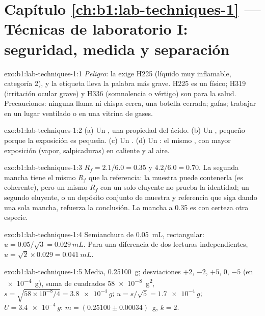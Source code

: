 \section*{Capítulo \ref{ch:b1:lab-techniques-1} --- Técnicas de laboratorio I: seguridad, medida y separación}

\begin{solution}{exo:b1:lab-techniques-1:1}
\emph{Peligro}: la exige H225 (líquido muy inflamable, categoría 2), y la
etiqueta lleva la palabra más grave. H225 es un  físico; H319
(irritación ocular grave) y H336 (somnolencia o vértigo) son 
para la salud. Precauciones: ninguna llama ni chispa cerca, una botella
cerrada; gafas; trabajar en un lugar ventilado o en una vitrina de gases.
\end{solution}

\begin{solution}{exo:b1:lab-techniques-1:2}
(a) Un , una propiedad del ácido. (b) Un , pequeño porque
la exposición es pequeña. (c) Un . (d) Un : el mismo
, con mayor exposición (vapor, salpicaduras) en caliente y al
aire.
\end{solution}

\begin{solution}{exo:b1:lab-techniques-1:3}
$R_f = 2.1/6.0 = 0.35$ y $4.2/6.0 = 0.70$. La segunda mancha tiene el
mismo $R_f$ que la referencia: la muestra puede contenerla (es
coherente), pero un mismo $R_f$ con un solo eluyente no prueba la
identidad; un segundo eluyente, o un depósito conjunto de muestra y
referencia que siga dando una sola mancha, refuerza la conclusión. La
mancha a 0.35 es con certeza otra especie.
\end{solution}

\begin{solution}{exo:b1:lab-techniques-1:4}
Semianchura de \qty{0.05}{mL}, rectangular: $u = 0.05/\sqrt3 = \qty{0.029}{mL}$.
Para una diferencia de dos lecturas independientes,
$u = \sqrt{2} \times 0.029 = \qty{0.041}{mL}$.
\end{solution}

\begin{solution}{exo:b1:lab-techniques-1:5}
Media, \qty{0.25100}{g}; desviaciones $+2$, $-2$, $+5$, 0, $-5$ (en
\qty{e-4}{g}), suma de cuadrados \qty{58e-8}{g^2}, $s = \sqrt{58 \times
10^{-8}/4} = \qty{3.8e-4}{g}$; $u = s/\sqrt5 = \qty{1.7e-4}{g}$;
$U = \qty{3.4e-4}{g}$: $m = (0.25100 \pm 0.00034)$~g, $k = 2$.
\end{solution}


